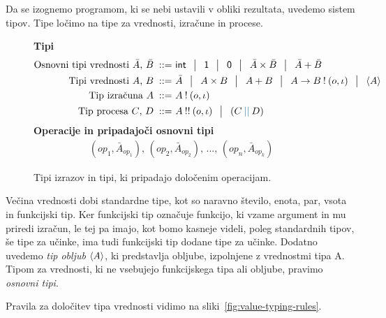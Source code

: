 Da se izognemo programom, ki se nebi ustavili v obliki rezultata, uvedemo sistem tipov.
Tipe ločimo na tipe za vrednosti, izračune in procese.

\begin{figure}[H]
	\centering
	\small
	\textbf{Tipi}
	\begin{align*}
		\text{Osnovni tipi vrednosti $\bar{A}$, $\bar{B}$}
		\bnfis & \tysym{int} \,\bnfor\! \tyunit \,\bnfor\! \tyempty \,\bnfor\! \typrod{\bar{A}}{\bar{B}} \,\bnfor\! \tysum{\bar{A}}{\bar{B}}
		\\%
		\text{Tipi vrednosti $A$, $B$}
		\bnfis & \bar{A} \, \bnfor\! \typrod{A}{B} \,\bnfor\! \tysum{A}{B} \,\bnfor\! \tyfun{A}{\tycomp{B}{\o,\i}} \,\bnfor\! \typromise{A}
		\\
		\text{Tip izračuna $A$} \bnfis& \tycomp{A}{\o,\i}
		\\
		\text{Tip procesa $\tyC$, $\tyD$}  \bnfis & \tyrun{A}{\o, \i} \,\bnfor\! \typar{\tyC}{\tyD}
	\end{align*}
	\textbf{Operacije in pripadajoči osnovni tipi}
	\begin{align*}
		(op_1, \bar{A}_{op_1}),\, (op_2, \bar{A}_{op_2}),\, ... ,\, (op_n, \bar{A}_{op_k})
	\end{align*}
	\caption{Tipi izrazov in tipi, ki pripadajo določenim operacijam.}
	\label{fig:tipi}
\end{figure}

Večina vrednosti dobi standardne tipe, kot so naravno število, enota, par, vsota in funkcijski tip. 
Ker funkcijski tip označuje funkcijo, ki vzame argument in mu priredi izračun, le tej pa imajo, kot bomo kasneje videli, poleg standardnih tipov, še tipe za učinke, ima tudi funkcijski tip dodane tipe za učinke.
Dodatno uvedemo \emph{tip obljub} $\langle A \rangle$, ki predstavlja obljube, izpolnjene z vrednostmi tipa A. 
Tipom za vrednosti, ki ne vsebujejo funkcijskega tipa ali obljube, pravimo \emph{osnovni tipi}.

Pravila za določitev tipa vrednosti vidimo na sliki~\ref{fig:value-typing-rules}.


